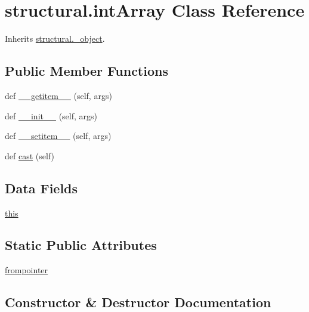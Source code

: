 \hypertarget{classstructural_1_1int_array}{}\section{structural.\+int\+Array Class Reference}
\label{classstructural_1_1int_array}


Inherits \hyperlink{classstructural_1_1__object}{structural.\+\_\+object}.

\subsection*{Public Member Functions}
\begin{DoxyCompactItemize}
\item 
def \hyperlink{classstructural_1_1int_array_ae37e67623e0cb817ca31b6d38151d031}{\+\_\+\+\_\+getitem\+\_\+\+\_\+} (self, args)
\item 
def \hyperlink{classstructural_1_1int_array_a44c89c9460bea6c746c3d0dc7415d156}{\+\_\+\+\_\+init\+\_\+\+\_\+} (self, args)
\item 
def \hyperlink{classstructural_1_1int_array_a2ad043d2bf747b4ef9fda38ab236cfde}{\+\_\+\+\_\+setitem\+\_\+\+\_\+} (self, args)
\item 
def \hyperlink{classstructural_1_1int_array_aee658ae445a3792128a8ea1bb4da6f71}{cast} (self)
\end{DoxyCompactItemize}
\subsection*{Data Fields}
\begin{DoxyCompactItemize}
\item 
\hyperlink{classstructural_1_1int_array_a9b3c15a11e0d3dd7106392fcde1e6023}{this}
\end{DoxyCompactItemize}
\subsection*{Static Public Attributes}
\begin{DoxyCompactItemize}
\item 
\hyperlink{classstructural_1_1int_array_ae704904aecbe14d60874cf2418cc5857}{frompointer}
\end{DoxyCompactItemize}


\subsection{Constructor \& Destructor Documentation}
\mbox{\label{classstructural_1_1int_array_a44c89c9460bea6c746c3d0dc7415d156}} 

